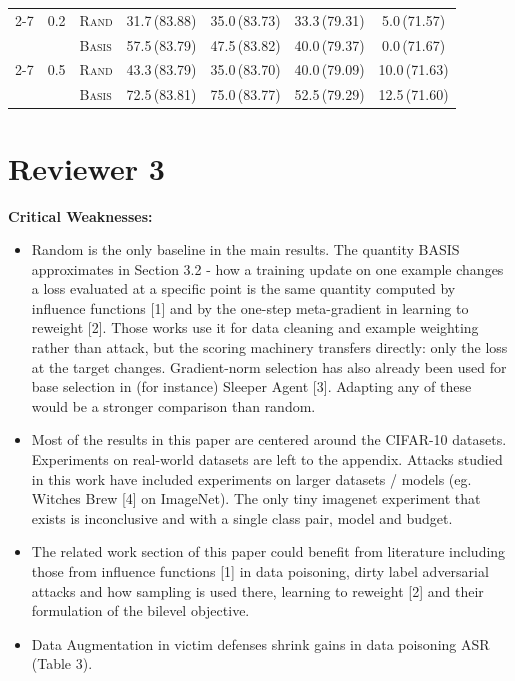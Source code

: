\begin{table}[h!]
{\begin{tabular}{@{}ll l cccc@{}}
\cmidrule(l){2-7}
         & 0.2 & \textsc{Rand}  & {31.7}\,(83.88) & 35.0\,(83.73) & 33.3\,(79.31) & 5.0\,(71.57) \\
         &     & \textsc{Basis} & {57.5}\,(83.79) & 47.5\,(83.82) & 40.0\,(79.37) & 0.0\,(71.67) \\
\cmidrule(l){2-7}
         & 0.5 & \textsc{Rand}  & {43.3}\,(83.79) & 35.0\,(83.70) & 40.0\,(79.09) & 10.0\,(71.63) \\
         &     & \textsc{Basis} & {72.5}\,(83.81) & 75.0\,(83.77) & 52.5\,(79.29) & 12.5\,(71.60) \\
\bottomrule
\end{tabular}%
}
\end{table}






\clearpage 





\section*{\Large{Reviewer 3}}


\noindent\textbf{Critical Weaknesses:}

\begin{itemize}
    \item Random is the only baseline in the main results. The quantity BASIS approximates in Section 3.2 - how a training update on one example changes a loss evaluated at a specific point is the same quantity computed by influence functions [1] and by the one-step meta-gradient in learning to reweight [2]. Those works use it for data cleaning and example weighting rather than attack, but the scoring machinery transfers directly: only the loss at the target changes. Gradient-norm selection has also already been used for base selection in (for instance) Sleeper Agent [3]. Adapting any of these would be a stronger comparison than random.

    \item Most of the results in this paper are centered around the CIFAR-10 datasets. Experiments on real-world datasets are left to the appendix. Attacks studied in this work have included experiments on larger datasets / models (eg. Witches Brew [4] on ImageNet). The only tiny imagenet experiment that exists is inconclusive and with a single class pair, model and budget.

    \item The related work section of this paper could benefit from literature including those from influence functions [1] in data poisoning, dirty label adversarial attacks and how sampling is used there, learning to reweight [2] and their formulation of the bilevel objective.

    \item Data Augmentation in victim defenses shrink gains in data poisoning ASR (Table 3).
\end{itemize}


